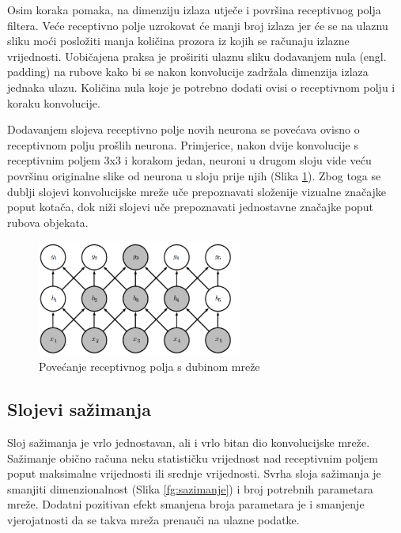 \documentclass[times, utf8, proizvoljni, numeric]{fer}
\begin{document}
Osim koraka pomaka, na dimenziju izlaza utječe i površina receptivnog polja filtera. Veće receptivno polje uzrokovat će manji broj izlaza jer će se na ulaznu sliku moći posložiti manja količina prozora iz kojih se računaju izlazne vrijednosti. Uobičajena praksa je proširiti ulaznu sliku dodavanjem nula (engl. padding) na rubove kako bi se nakon konvolucije zadržala dimenzija izlaza jednaka ulazu. Količina nula koje je potrebno dodati ovisi o receptivnom polju i koraku konvolucije.

Dodavanjem slojeva receptivno polje novih neurona se povećava ovisno o receptivnom polju prošlih neurona. Primjerice, nakon dvije konvolucije s receptivnim poljem 3x3 i korakom jedan, neuroni u drugom sloju vide veću površinu originalne slike od neurona u sloju prije njih (Slika \ref{fg:receptivno_polje}). Zbog toga se dublji slojevi konvolucijske mreže uče prepoznavati složenije vizualne značajke poput kotača, dok niži slojevi uče prepoznavati jednostavne značajke poput rubova objekata. 

\begin{figure}[!ht]
	\begin{center}
		\captionsetup{justification=centering}
		\includegraphics[width=0.6\textwidth]{./imgs/receptivno_polje.png}
		\caption{Povećanje receptivnog polja s dubinom mreže  \cite{deeplearningbook}}
		\label{fg:receptivno_polje}
	\end{center}
\end{figure}

\subsection{Slojevi sažimanja}

Sloj sažimanja je vrlo jednostavan, ali i vrlo bitan dio konvolucijske mreže. Sažimanje obično računa neku statističku vrijednost nad receptivnim poljem poput maksimalne vrijednosti ili srednje vrijednosti. Svrha sloja sažimanja je smanjiti dimenzionalnost (Slika \ref{fg:sazimanje}) i broj potrebnih parametara mreže. Dodatni pozitivan efekt smanjena broja parametara je i smanjenje vjerojatnosti da se takva mreža prenauči na ulazne podatke.
\end{document}
